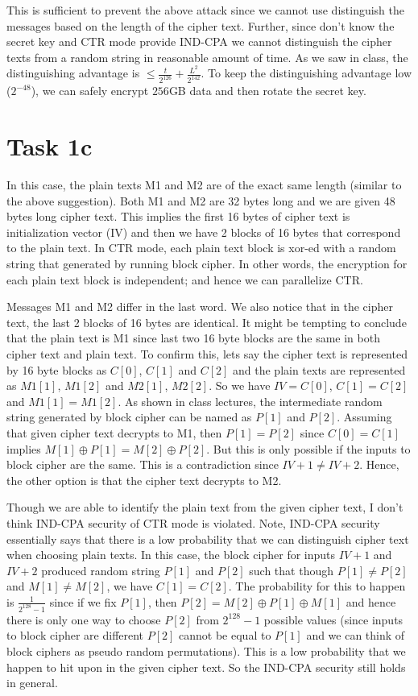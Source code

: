 \documentclass{article}
\begin{document}
    This is sufficient to prevent the above attack since we cannot use distinguish the messages based on the length of the cipher text. Further, since don't know the secret key and CTR mode provide IND-CPA we cannot distinguish the cipher texts from a random string in reasonable amount of time. As we saw in class, the distinguishing advantage is $\le \frac{t}{2^{126}} + \frac{L^2}{2^{142}}$. To keep the distinguishing advantage low ($2^{-48}$), we can safely encrypt $256$GB data and then rotate the secret key.

    \section*{Task 1c}
    In this case, the plain texts M1 and M2 are of the exact same length (similar to the above suggestion). Both M1 and M2 are 32 bytes long and we are given 48 bytes long cipher text. This implies the first 16 bytes of cipher text is initialization vector (IV) and then we have 2 blocks of 16 bytes that correspond to the plain text. In CTR mode, each plain text block is xor-ed with a random string that generated by running block cipher. In other words, the encryption for each plain text block is independent; and hence we can parallelize CTR.
    
    Messages M1 and M2 differ in the last word. We also notice that in the cipher text, the last 2 blocks of 16 bytes are identical. It might be tempting to conclude that the plain text is M1 since last two 16 byte blocks are the same in both cipher text and plain text. To confirm this, lets say the cipher text is represented by 16 byte blocks as $C[0]$, $C[1]$ and $C[2]$ and the plain texts are represented as $M1[1]$, $M1[2]$ and $M2[1]$, $M2[2]$. So we have $IV = C[0]$, $C[1] = C[2]$ and $M1[1] = M1[2]$. As shown in class lectures, the intermediate random string generated by block cipher can be named as $P[1]$ and $P[2]$. Assuming that given cipher text decrypts to M1, then $P[1] = P[2]$ since $C[0] = C[1]$ implies $M[1] \oplus P[1] = M[2] \oplus P[2]$. But this is only possible if the inputs to block cipher are the same. This is a contradiction since $IV + 1 \ne IV + 2$. Hence, the other option is that the cipher text decrypts to M2.
    
    Though we are able to identify the plain text from the given cipher text, I don't think IND-CPA security of CTR mode is violated. Note, IND-CPA security essentially says that there is a low probability that we can distinguish cipher text when choosing plain texts. In this case, the block cipher for inputs $IV + 1$ and $IV + 2$ produced random string $P[1]$ and $P[2]$ such that though $P[1] \ne P[2]$ and $M[1] \ne M[2]$, we have $C[1] = C[2]$. The probability for this to happen is $\frac{1}{2^{128} - 1}$ since if we fix $P[1]$, then $P[2] = M[2] \oplus P[1] \oplus M[1]$ and hence there is only one way to choose $P[2]$ from $2^{128} - 1$ possible values (since inputs to block cipher are different $P[2]$ cannot be equal to $P[1]$ and we can think of block ciphers as pseudo random permutations). This is a low probability that we happen to hit upon in the given cipher text. So the IND-CPA security still holds in general.
\end{document}
